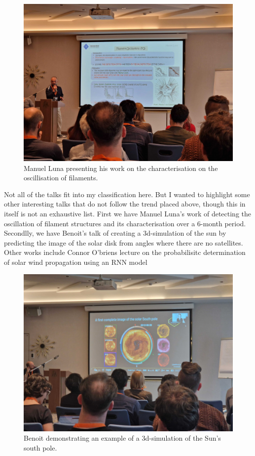 \documentclass[11pt]{article}
\begin{document}
\begin{figure}[htbp]
\centering
\includegraphics[width=1.0\textwidth]{images/20230419_102413.jpg}
\caption{Manuel Luna presenting his work on the characterisation on the oscillisation of filaments.}
\end{figure}

Not all of the talks fit into my classification here. But I wanted to
highlight some other interesting talks that do not follow the trend
placed above, though this in itself is not an exhaustive list. First
we have Manuel Luna's work of detecting the oscillation of filament
structures and its characterisation over a 6-month period. Secondlly,
we have Benoit's talk of creating a 3d-simulation of the sun by
predicting the image of the solar disk from angles where there are no
satellites. Other works include Connor O'briens lecture on the
probabilisitc determination of solar wind propagation using an RNN
model

\begin{figure}[htbp]
\centering
\includegraphics[width=1.0\textwidth]{images/20230419_173438.jpg}
\caption{Benoit demonstrating an example of a 3d-simulation of the Sun's south pole.}
\end{figure}
\end{document}

